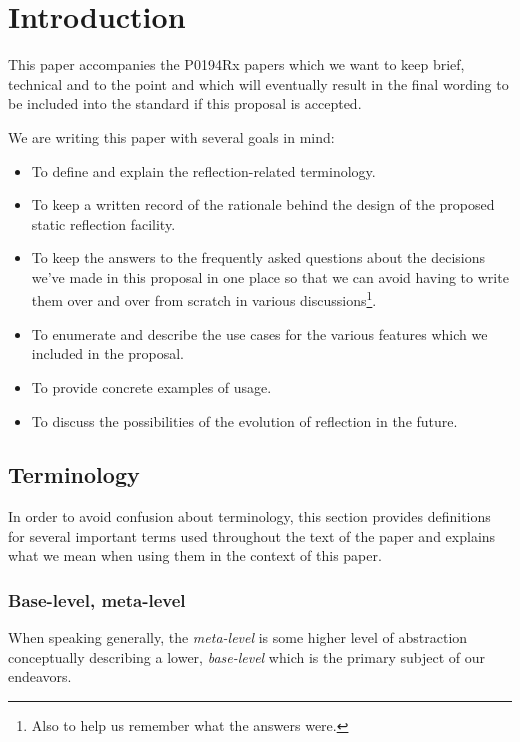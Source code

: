 \section{Introduction}

This paper accompanies the P0194Rx papers which we want to keep brief, technical
and to the point and which will eventually result in the final wording to be
included into the standard if this proposal is accepted.

We are writing this paper with several goals in mind:

\begin{itemize}
\item To define and explain the reflection-related terminology.
\item To keep a written record of the rationale behind the design of the
proposed static reflection facility.
\item To keep the answers to the frequently asked questions about
the decisions we've made in this proposal in one place so that we can avoid
having to write them over and over from scratch in various discussions\footnote{
Also to help us remember what the answers were.}.
\item To enumerate and describe the use cases for the various features
which we included in the proposal.
\item To provide concrete examples of usage.
\item To discuss the possibilities of the evolution of reflection in the future.
\end{itemize}

\subsection{Terminology}

In order to avoid confusion about terminology, this section provides definitions
for several important terms used throughout the text of the paper and
explains what we mean when using them in the context of this paper.

\subsubsection{Base-level, meta-level}
\label{term-base-meta-level}

When speaking generally, the {\em meta-level} is some higher level of abstraction
conceptually describing a lower, {\em base-level} which is the primary subject
of our endeavors.

